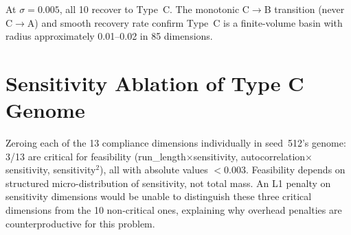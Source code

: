 \documentclass[twoside,11pt]{article}
\begin{document}
At $\sigma = 0.005$, all 10 recover to Type~C. The monotonic C$\to$B transition
(never C$\to$A) and smooth recovery rate confirm Type~C is a finite-volume basin
with radius approximately 0.01--0.02 in 85 dimensions.

\section{Sensitivity Ablation of Type C Genome}
\label{app:ablation}

Zeroing each of the 13 compliance dimensions individually in seed~512's genome:
3/13 are critical for feasibility (run\_length$\times$sensitivity,
autocorrelation$\times$sensitivity, sensitivity$^2$), all with absolute
values $<$0.003. Feasibility depends on structured micro-distribution of
sensitivity, not total mass. An L1 penalty on sensitivity dimensions would be
unable to distinguish these three critical dimensions from the 10 non-critical
ones, explaining why overhead penalties are counterproductive for this problem.
\end{document}

